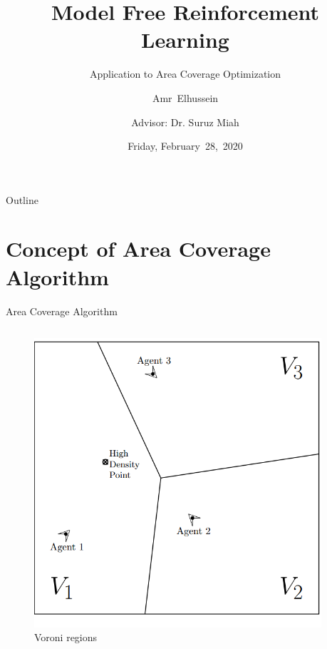 \documentclass{beamer}
\title{Model Free Reinforcement Learning}
\subtitle{Application to Area Coverage Optimization}
\author[A.Elhussein]{Amr~Elhussein  \\\and
Advisor: Dr. Suruz Miah}
\institute[Bradley University] %
{
  Department of Electrical and Computer Engineering\\
  Bradley University\\
  1501 W. Bradley Avenue\\
  Peoria, IL, 61625, USA
}
\date[February~28,~2020]{Friday, February~28,~2020}
\begin{document}
\begin{frame}
  \titlepage
\end{frame}

\begin{frame}{Outline}
  \tableofcontents
\end{frame}


\section{Concept of Area Coverage Algorithm}
\begin{frame}{Area Coverage Algorithm}
\begin{columns}
\begin{column}{0.5\textwidth}
\begin{center}
\begin{figure}
\includegraphics[scale=0.2]{figs/img/voroni.png}
\caption{Voroni regions}
\end{figure}
\end{center}
\end{column}
\begin{column}{0.5\textwidth}
\begin{center}

\end{center}
\end{column}
\end{columns}
\end{frame}
\end{document}
